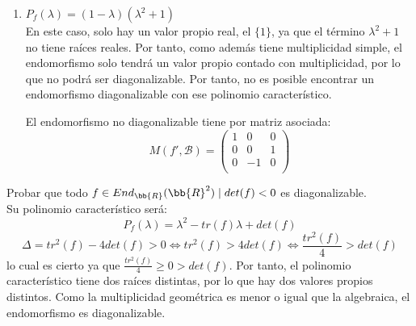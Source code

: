 \begin{ejercicio}
\begin{enumerate}
        \item $P_f(\lambda) = (1-\lambda)(\lambda^2+1)$\\
        En este caso, solo hay un valor propio real, el $\{1\}$, ya que el término $\lambda^2+1$ no tiene raíces reales. Por tanto, como además tiene multiplicidad simple, el endomorfismo solo tendrá un valor propio contado con multiplicidad, por lo que no podrá ser diagonalizable. Por tanto, no es posible encontrar un endomorfismo diagonalizable con ese polinomio característico.

        El endomorfismo no diagonalizable tiene por matriz asociada:
        $$M(f', \mathcal{B}) = \left( \begin{array}{ccc}
            1 & 0 & 0 \\
            0 & 0 & 1 \\
            0 & -1 & 0 \\
        \end{array}\right)$$
    \end{enumerate}
\end{ejercicio}

\begin{ejercicio}
    Probar que todo $f\in End_\bb{R}(\bb{R}^2) \mid det(f)<0$ es diagonalizable.\\

    Su polinomio característico será:
    $$P_f(\lambda) = \lambda^2 - tr(f)\lambda + det(f)$$
    $$\Delta = tr^2(f) -4det(f) > 0 \Longleftrightarrow tr^2(f) > 4det(f) \Longleftrightarrow \frac{tr^2(f)}{4} > det(f)$$
    lo cual es cierto ya que $\frac{tr^2(f)}{4} \geq 0 > det(f)$. Por tanto, el polinomio característico tiene dos raíces distintas, por lo que hay dos valores propios distintos. Como la multiplicidad geométrica es menor o igual que la algebraica, el endomorfismo es diagonalizable.    
\end{ejercicio}

